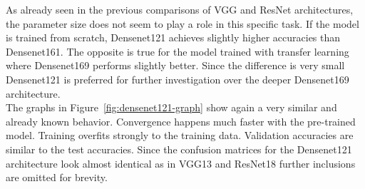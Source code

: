 \begin{table}[!h] \centering
{}
\caption{Hyper parameters for Densenet121 optimized with SigOpt. First row shows hyper parameters training the architecture from scratch. Second row used pre-trained weights from ImageNet.}
\label{tbl:Densenet121_overview}
\end{table}

As already seen in the previous comparisons of VGG and ResNet architectures, the parameter size does not seem to play a role in this specific task. If the model is trained from scratch, Densenet121 achieves slightly higher accuracies than Densenet161. The opposite is true for the model trained with transfer learning where Densenet169 performs slightly better. Since the difference is very small Densenet121 is preferred for further investigation over the deeper Densenet169 architecture.\\

The graphs in Figure~\ref{fig:densenet121-graph} show again a very similar and already known behavior. Convergence happens much faster with the pre-trained model. Training overfits strongly to the training data. Validation accuracies are similar to the test accuracies. Since the confusion matrices for the Densenet121 architecture look almost identical as in VGG13 and ResNet18 further inclusions are omitted for brevity. \\


